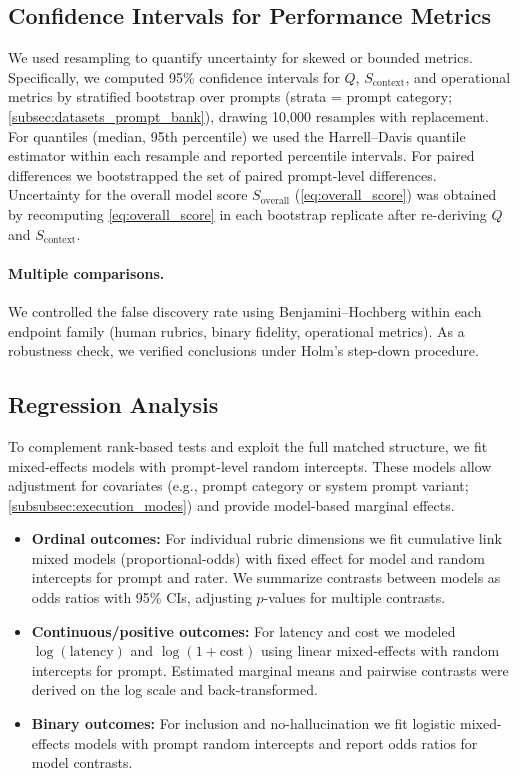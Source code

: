 \subsection{Confidence Intervals for Performance Metrics}\label{subsec:confidence_intervals}

We used resampling to quantify uncertainty for skewed or bounded metrics. Specifically, we computed 95\% confidence intervals for $Q$, $S_{\text{context}}$, and operational metrics by stratified bootstrap over prompts (strata = prompt category; \cref{subsec:datasets_prompt_bank}), drawing 10{,}000 resamples with replacement. For quantiles (median, 95th percentile) we used the Harrell--Davis quantile estimator within each resample and reported percentile intervals. For paired differences we bootstrapped the set of paired prompt-level differences. Uncertainty for the overall model score $S_{\text{overall}}$ (\cref{eq:overall_score}) was obtained by recomputing \cref{eq:overall_score} in each bootstrap replicate after re-deriving $Q$ and $S_{\text{context}}$.

\paragraph{Multiple comparisons.} We controlled the false discovery rate using Benjamini--Hochberg within each endpoint family (human rubrics, binary fidelity, operational metrics). As a robustness check, we verified conclusions under Holm's step-down procedure.

\subsection{Regression Analysis}\label{subsec:regression_analysis}

To complement rank-based tests and exploit the full matched structure, we fit mixed-effects models with prompt-level random intercepts. These models allow adjustment for covariates (e.g., prompt category or system prompt variant; \cref{subsubsec:execution_modes}) and provide model-based marginal effects.

\begin{itemize}
	\item \textbf{Ordinal outcomes:} For individual rubric dimensions we fit cumulative link mixed models (proportional-odds) with fixed effect for model and random intercepts for prompt and rater. We summarize contrasts between models as odds ratios with 95\% CIs, adjusting $p$-values for multiple contrasts.
	\item \textbf{Continuous/positive outcomes:} For latency and cost we modeled $\log(\text{latency})$ and $\log(1+\text{cost})$ using linear mixed-effects with random intercepts for prompt. Estimated marginal means and pairwise contrasts were derived on the log scale and back-transformed.
	\item \textbf{Binary outcomes:} For inclusion and no-hallucination we fit logistic mixed-effects models with prompt random intercepts and report odds ratios for model contrasts.
\end{itemize}

